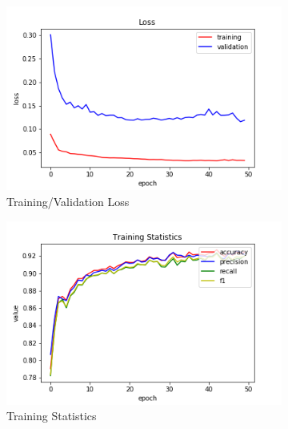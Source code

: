 \begin{figure}[h!]
  \centerfloat
  \begin{subfigure}[b]{0.35\linewidth}
    \includegraphics[width=\linewidth]{images/cae_online_lstm/caelstm_section_lstm_training_uniform_random_fill_10000_block_map_10000_house_10000_model_loss.png}
     \caption{Training/Validation Loss}
  \end{subfigure}
  \hfill
  \begin{subfigure}[b]{0.35\linewidth}
    \includegraphics[width=\linewidth]{images/cae_online_lstm/caelstm_section_lstm_training_uniform_random_fill_10000_block_map_10000_house_10000_model_training_stats.png}
     \caption{Training Statistics}
  \end{subfigure}
  \hfill
  \begin{subfigure}[b]{0.35\linewidth}

\end{subfigure}
\end{figure}

